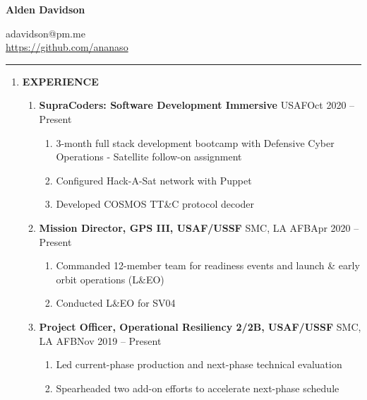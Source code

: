 \documentclass[11pt]{article}
\begin{document}
\begin{center}
\begin{minipage}[b]{0.70\textwidth}
	{\Huge\textbf{Alden Davidson}}
\end{minipage}%
\begin{minipage}[b]{0.30\textwidth}
	\raggedleft
	adavidson@pm.me\\
    \url{https://github.com/ananaso}
\end{minipage}
\end{center}
\textcolor{black!60}{\rule{\textwidth}{3pt}}
\begin{center}
\begin{enumerate}[label={}, leftmargin=0pt, parsep=5pt]
    \item {\Large \textbf{EXPERIENCE}}
    \begin{enumerate}[label={}, itemsep=5pt]
        \item \textbf{SupraCoders: Software Development Immersive} \textbar{} USAF\hfill Oct 2020 -- Present
        \begin{enumerate}[label={--}]
            \item 3-month full stack development bootcamp with Defensive Cyber Operations - Satellite follow-on assignment
            \item Configured Hack-A-Sat network with Puppet
            \item Developed COSMOS TT\&C protocol decoder
        \end{enumerate}
        \item \textbf{Mission Director, GPS III, USAF/USSF} \textbar{} SMC, LA AFB\hfill Apr 2020 -- Present
        \begin{enumerate}[label={--}]
            \item Commanded 12-member team for readiness events and launch \& early orbit operations (L\&EO)
            \item Conducted L\&EO for SV04
        \end{enumerate}
        \item \textbf{Project Officer, Operational Resiliency 2/2B, USAF/USSF} \textbar{} SMC, LA AFB\hfill Nov 2019 -- Present
        \begin{enumerate}[label={--}]
            \item Led current-phase production and next-phase technical evaluation
            \item Spearheaded two add-on efforts to accelerate next-phase schedule

\end{enumerate}
\end{enumerate}
\end{enumerate}
\end{center}
\end{document}
